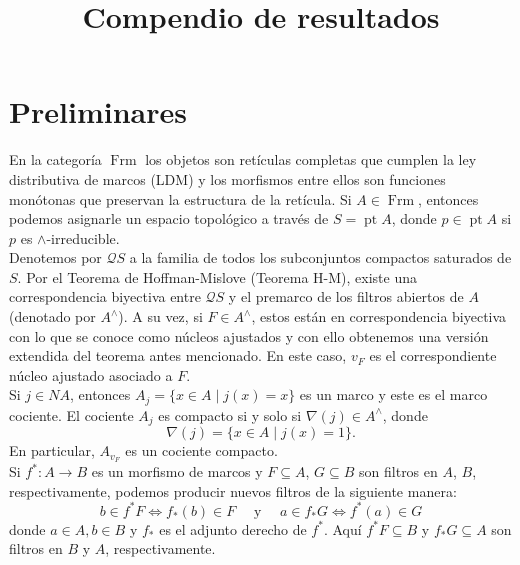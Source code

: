\documentclass[11pt]{amsart}
\DeclareMathOperator{\pt}{pt}
\DeclareMathOperator{\Frm}{Frm}
\theoremstyle{plain}
\theoremstyle{definition}
\begin{document}

\title{Compendio de resultados}


\author{}
\email{}
\address{}


\address{}

\begin{abstract}

\end{abstract}

\maketitle
\section{Preliminares}
En la categoría $\Frm$ los objetos son retículas completas que cumplen la ley distributiva 
de marcos (LDM) y los morfismos entre ellos son funciones monótonas que preservan la estructura de la retícula. Si $A\in \Frm$, entonces podemos asignarle un espacio topológico a 
través de $S=\pt A$, donde $p\in \pt A$ si $p$ es $\wedge$-irreducible.\\

Denotemos por $\mathcal{Q}S$ a la familia de todos los subconjuntos compactos saturados de $S$. Por el Teorema de Hoffman-Mislove (Teorema H-M), existe una correspondencia
biyectiva entre $\mathcal{Q}S$ y el premarco de los filtros abiertos de $A$ (denotado por $A^\wedge$). A su vez, si $F\in A^\wedge$, estos están en correspondencia biyectiva con lo que se conoce como 
núcleos ajustados y con ello obtenemos una versión extendida del teorema antes mencionado. En este caso, $v_F$ es el correspondiente núcleo ajustado asociado a $F$.\\

Si $j\in NA$, entonces $A_j=\{x\in A\mid j(x)=x\}$ es un marco y este es el marco cociente. El cociente $A_j$ es compacto si y solo si $\nabla(j)\in A^\wedge$, donde 
\[
\nabla(j)=\{x\in A\mid j(x)=1\}.
\]
En particular, $A_{v_F}$ es un cociente compacto.\\

Si $f^*\colon A\to B$ es un morfismo de marcos y $F\subseteq A$, $G\subseteq B$ son filtros en $A$, $B$, respectivamente, podemos producir nuevos filtros de la siguiente manera:
\begin{equation}\label{Imagenfiltros}
b\in f^*F \Leftrightarrow f_*(b)\in F\quad \mbox{ y }\quad a\in f_*G \Leftrightarrow f^*(a)\in G
\end{equation}
donde $a\in A, b\in B$ y $f_*$ es el adjunto derecho de $f^*$. Aquí $f^*F\subseteq B$ y $f_*G\subseteq A$ son filtros en $B$ y $A$, respectivamente.\\
\end{document}
